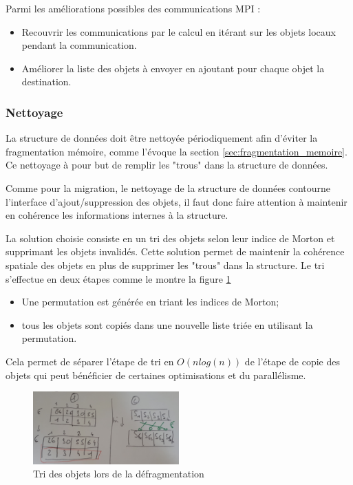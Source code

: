 Parmi les améliorations possibles des communications MPI :
\begin{itemize}
\item Recouvrir les communications par le calcul en itérant sur les objets locaux pendant la communication.
\item Améliorer la liste des objets à envoyer en ajoutant pour chaque objet la destination.
\end{itemize}

\subsubsection{Nettoyage}

La structure de données doit être nettoyée périodiquement afin d'éviter la fragmentation mémoire, comme l'évoque la section \ref{sec:fragmentation_memoire}. Ce nettoyage à pour but de remplir les "trous" dans la structure de données. 

Comme pour la migration, le nettoyage de la structure de données contourne l'interface d'ajout/suppression des objets, il faut donc faire attention à maintenir en cohérence les informations internes à la structure.

La solution choisie consiste en un tri des objets selon leur indice de Morton et supprimant les objets invalidés. Cette solution permet de maintenir la cohérence spatiale des objets en plus de supprimer les "trous" dans la structure. Le tri s'effectue en deux étapes comme le montre la figure \ref{fig:nettoyage_tri}
\newcommand*\circled[1]{\tikz[baseline=(char.base)]{ \node[shape=circle,draw,inner sep=1pt] (char) {#1};} }
\begin{itemize}
	\item \circled{1} Une permutation est générée en triant les indices de Morton;
	\item \circled{2} tous les objets sont copiés dans une nouvelle liste triée en utilisant la permutation.
\end{itemize}
Cela permet de séparer l'étape de tri en $O(nlog(n))$ de l'étape de copie des objets qui peut bénéficier de certaines optimisations et du parallélisme.

\begin{figure}
	\centering
	\includegraphics[width=0.5\textwidth]{img/nettoyage_tri}
	\caption{Tri des objets lors de la défragmentation}
	\label{fig:nettoyage_tri}
\end{figure}

